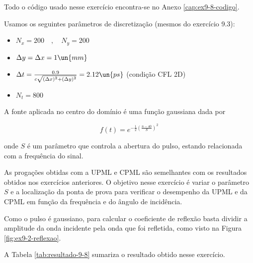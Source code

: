 Todo o código usado nesse exercício encontra-se no Anexo \ref{cap:ex9-8-codigo}.

Usamos os seguintes parâmetros de discretização (mesmos do exercício 9.3):

\begin{itemize}
	\item $N_x = 200 \quad , \quad N_y = 200$
	\item $\Delta y = \Delta x = 1 \un{mm}$
	\item $\Delta t = \frac{0.9}{c \sqrt{(\Delta x)^{2} + (\Delta y)^{2}}} = 2.12 \un{ps} $ (condição CFL 2D)
	\item $N_t = 800$
\end{itemize}

A fonte aplicada no centro do domínio é uma função gaussiana dada por 

\[ f(t) = e^{-\frac{1}{2}\left(\frac{n - 40}{S}\right)^2} \]

\noindent onde $S$ é um parâmetro que controla a abertura do pulso, estando relacionada com a frequência do sinal.

As progações obtidas com a UPML e CPML são semelhantes com os resultados
obtidos nos exercícios anteriores. O objetivo nesse exercício é variar o parâmetro $S$ e a localização da ponta 
de prova para verificar o desempenho da UPML e da CPML em função da frequência e do ângulo de incidência.

Como o pulso é gaussiano, para calcular o coeficiente de reflexão basta dividir a amplitude da onda incidente pela
onda que foi refletida, como visto na Figura \ref{fig:ex9-2-reflexao}.

A Tabela \ref{tab:resultado-9-8} sumariza o resultado obtido nesse exercício.


